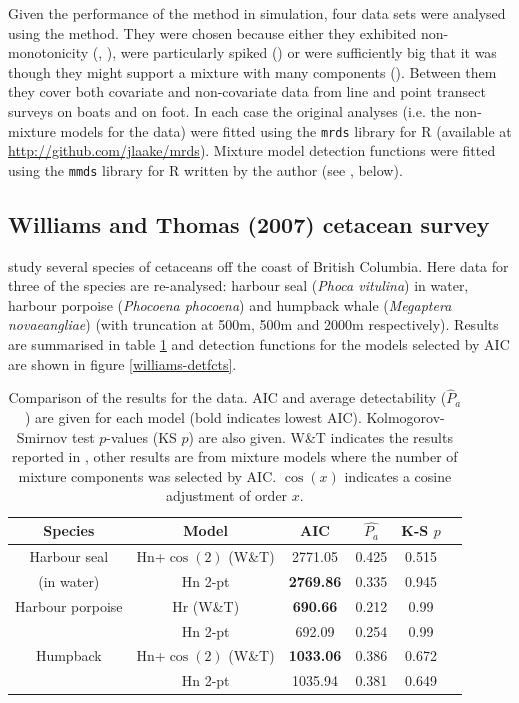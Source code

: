 Given the performance of the method in simulation, four data sets were analysed using the method. They were chosen because either they exhibited non-monotonicity (\cite{williams}, \cite{pike}), were particularly spiked (\cite{ants}) or were sufficiently big that it was though they might support a mixture with many components (\cite{amakihi}). Between them they cover both covariate and non-covariate data from line and point transect surveys on boats and on foot. \label{cor-soft5}In each case the original analyses (i.e. the non-mixture models for the data) were fitted using the \texttt{mrds} library for \textsf{R} (available at \url{http://github.com/jlaake/mrds}). Mixture model detection functions were fitted using the \texttt{mmds} library for \textsf{R} written by the author (see , below).

\subsection{Williams and Thomas (2007) cetacean survey}

 study several species of cetaceans off the coast of British Columbia. Here data for three of the species are re-analysed: harbour seal (\textit{Phoca vitulina}) in water, harbour porpoise (\textit{Phocoena phocoena}) and humpback whale (\textit{Megaptera novaeangliae}) (with truncation at 500m, 500m and 2000m respectively). Results are summarised in table \ref{williams-table} and detection functions for the models selected by AIC are shown in figure \ref{williams-detfcts}.

\begin{table}
\centering
\begin{tabular}{c c c c c c}
Species & Model & AIC & $\hat{P_a}$ & K-S $p$\\
\hline
Harbour seal & Hn+$\cos(2)$ (W\&T) & 2771.05 & 0.425 & 0.515\\
(in water) & Hn 2-pt  & \textbf{2769.86} & 0.335 & 0.945\\
Harbour porpoise & Hr (W\&T) & \textbf{690.66} & 0.212 & 0.99\\
 & Hn 2-pt & 692.09 & 0.254 & 0.99\\
Humpback & Hn+$\cos(2)$ (W\&T) & \textbf{1033.06} & 0.386 & 0.672 \\
 & Hn 2-pt & 1035.94 & 0.381 & 0.649 \\
\end{tabular}
\caption{Comparison of the results for the  data. AIC and average detectability ($\hat{P}_a$) are given for each model (bold indicates lowest AIC). Kolmogorov-Smirnov test $p$-values (KS $p$) are also given.  W\&T indicates the results reported in , other results are from mixture models where the number of mixture components was selected by AIC. $\cos(x)$ indicates a cosine adjustment of order $x$.\label{cor-8s11}}
\label{williams-table}
\end{table}

